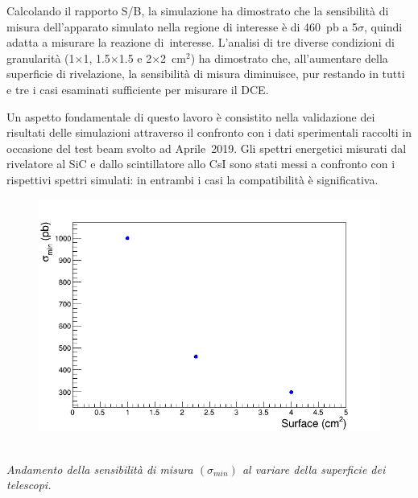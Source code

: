 \documentclass[10pt,foldmark,notumble]{leaflet}
\begin{document}
Calcolando il rapporto S/B, la simulazione ha dimostrato che la sensibilità di misura dell'apparato simulato nella regione di interesse è di 460~pb a 5$\sigma$, quindi adatta a misurare la reazione di~interesse.
L'analisi di tre diverse condizioni di granularità (1$\times$1, 1.5$\times$1.5 e 2$\times$2~$\mbox{cm}^2$) ha dimostrato che, all'aumentare della superficie di rivelazione, la sensibilità di misura diminuisce, pur restando in tutti e tre i casi esaminati sufficiente per misurare il DCE.

Un aspetto fondamentale di questo lavoro è consistito nella validazione dei risultati delle simulazioni attraverso il confronto con i dati sperimentali raccolti in occasione del test beam svolto ad Aprile~2019.
Gli spettri energetici misurati dal rivelatore al SiC e dallo scintillatore allo CsI sono stati messi a confronto con i rispettivi spettri simulati: in entrambi i casi la compatibilità è significativa.
\begin{figure} [!h]
	\centering
	\includegraphics[width=0.7\columnwidth, keepaspectratio]{Grafici_Tesi2/Granularitanew/sigma_min.png}
\end{figure}\\
\textit{Andamento della sensibilità di misura $(\sigma_{min})$ al variare della superficie dei telescopi.}\\
\end{document}
